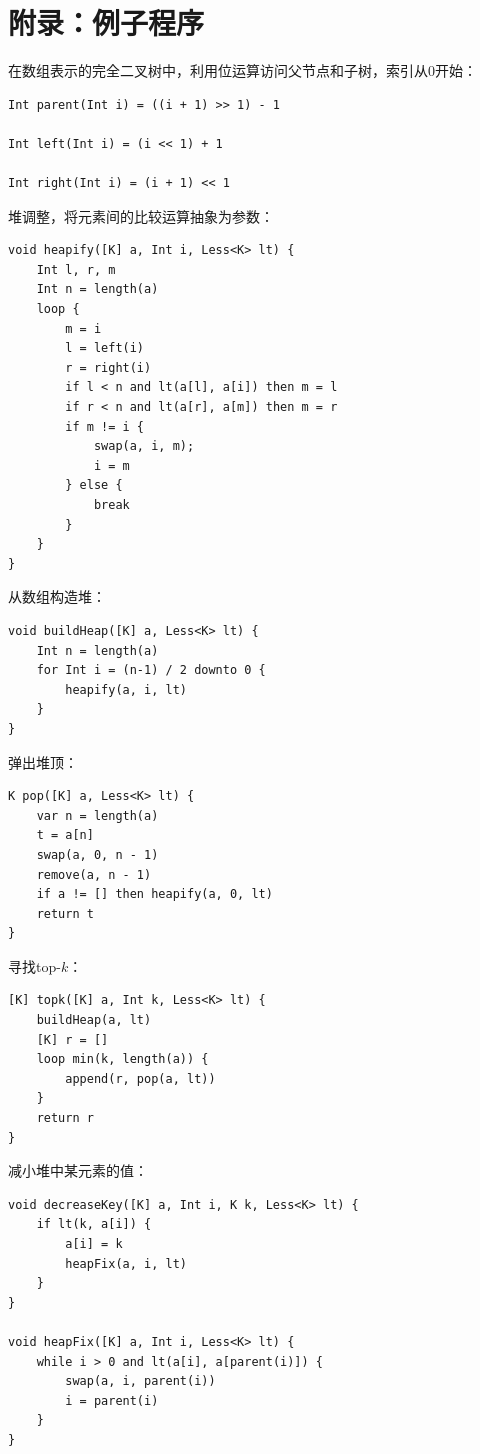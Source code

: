 \documentclass[b5paper]{ctexart}
\begin{document}
\section{附录：例子程序}

在数组表示的完全二叉树中，利用位运算访问父节点和子树，索引从0开始：

\begin{lstlisting}[language = Bourbaki]
Int parent(Int i) = ((i + 1) >> 1) - 1

Int left(Int i) = (i << 1) + 1

Int right(Int i) = (i + 1) << 1
\end{lstlisting}

堆调整，将元素间的比较运算抽象为参数：

\begin{lstlisting}[language = Bourbaki]
void heapify([K] a, Int i, Less<K> lt) {
    Int l, r, m
    Int n = length(a)
    loop {
        m = i
        l = left(i)
        r = right(i)
        if l < n and lt(a[l], a[i]) then m = l
        if r < n and lt(a[r], a[m]) then m = r
        if m != i {
            swap(a, i, m);
            i = m
        } else {
            break
        }
    }
}
\end{lstlisting}

从数组构造堆：

\begin{lstlisting}[language = Bourbaki]
void buildHeap([K] a, Less<K> lt) {
    Int n = length(a)
    for Int i = (n-1) / 2 downto 0 {
        heapify(a, i, lt)
    }
}
\end{lstlisting}

弹出堆顶：

\begin{lstlisting}[language = Bourbaki]
K pop([K] a, Less<K> lt) {
    var n = length(a)
    t = a[n]
    swap(a, 0, n - 1)
    remove(a, n - 1)
    if a != [] then heapify(a, 0, lt)
    return t
}
\end{lstlisting}

寻找top-$k$：

\begin{lstlisting}[language = Bourbaki]
[K] topk([K] a, Int k, Less<K> lt) {
    buildHeap(a, lt)
    [K] r = []
    loop min(k, length(a)) {
        append(r, pop(a, lt))
    }
    return r
}
\end{lstlisting}

减小堆中某元素的值：

\begin{lstlisting}[language = Bourbaki]
void decreaseKey([K] a, Int i, K k, Less<K> lt) {
    if lt(k, a[i]) {
        a[i] = k
        heapFix(a, i, lt)
    }
}

void heapFix([K] a, Int i, Less<K> lt) {
    while i > 0 and lt(a[i], a[parent(i)]) {
        swap(a, i, parent(i))
        i = parent(i)
    }
}
\end{lstlisting}
\end{document}
